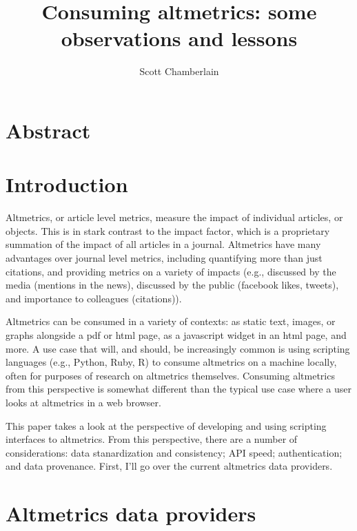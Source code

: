 \documentclass[letterpaper,superscriptaddress,showkeys,longbibliography]{revtex4-1}\usepackage{graphicx, color}
\begin{document}
\title{Consuming altmetrics: some observations and lessons}

\author{Scott Chamberlain}


\maketitle

\section{Abstract}

\section{Introduction}

Altmetrics, or article level metrics, measure the impact of individual articles, or objects. This is in stark contrast to the impact factor, which is a proprietary summation of the impact of all articles in a journal. Altmetrics have many advantages over journal level metrics, including quantifying more than just citations, and providing metrics on a variety of impacts (e.g., discussed by the media (mentions in the news), discussed by the public (facebook likes, tweets), and importance to colleagues (citations)). 

Altmetrics can be consumed in a variety of contexts: as static text, images, or graphs alongside a pdf or html page, as a javascript widget in an html page, and more. A use case that will, and should, be increasingly common is using scripting languages (e.g., Python, Ruby, R) to consume altmetrics on a machine locally, often for purposes of research on altmetrics themselves. Consuming altmetrics from this perspective is somewhat different than the typical use case where a user looks at altmetrics in a web browser. 

This paper takes a look at the perspective of developing and using scripting interfaces to altmetrics. From this perspective, there are a number of considerations: data stanardization and consistency; API speed; authentication; and data provenance. First, I'll go over the current altmetrics data providers. 

\section{Altmetrics data providers}
\end{document}

